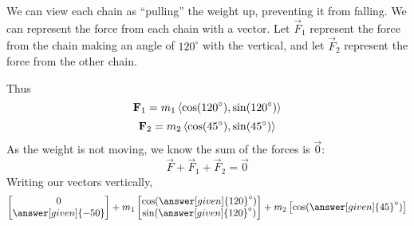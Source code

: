 \documentclass{ximera}
\begin{document}
\begin{example}
\begin{explanation}
\begin{image}
    \end{image}
    We can view each chain as ``pulling'' the weight up, preventing it
    from falling. We can represent the force from each chain with a
    vector. Let $\vec F_1$ represent the force from the chain making
    an angle of $120^\circ$ with the vertical, and let $\vec F_2$
    represent the force from the other chain.
    \begin{image}
  \end{image}
    Thus
    \[
    \mathbf F_1 = m_1\left\langle \cos(120^\circ),\sin(120^\circ)\right\rangle
    \]
    \[
    \mathbf F_2 = m_2\left\langle \cos(45^\circ),\sin(45^\circ)\right\rangle
    \]
    As the weight is not moving, we know the sum of the forces is
    $\vec 0$:
    \[
    \vec F + \vec F_1 + \vec F_2 = \vec 0
    \]
    Writing our vectors vertically,
    \[
      \begin{bmatrix}
        0\\
        \answer[given]{-50}
      \end{bmatrix}
      +m_1
      \begin{bmatrix}
        \cos(\answer[given]{120}^\circ)\\
        \sin(\answer[given]{120}^\circ)
      \end{bmatrix}
      + m_2
      \begin{bmatrix}
      \cos(\answer[given]{45}^\circ)\\

\end{bmatrix}\]
\end{explanation}
\end{example}
\end{document}
